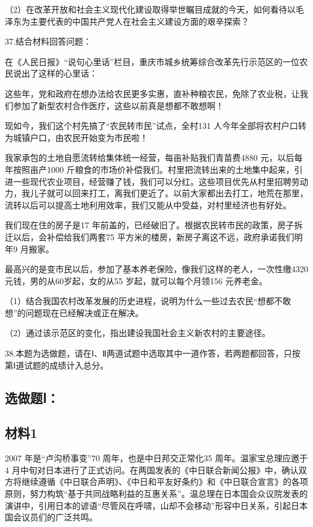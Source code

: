 \documentclass[UTF8,11pt]{ctexart}
\begin{document}
（2）在改革开放和社会主义现代化建设取得举世瞩目成就的今天，如何看待以毛泽东为主要代表的中国共产党人在社会主义建设方面的艰辛探索？


37.结合材料回答问题：

在《人民日报》“说句心里话”栏目，重庆市城乡统筹综合改革先行示范区的一位农民说出了这样的心里话：

这些年，党和政府在想办法给农民更多实惠，直补种粮农民，免除了农业税，让我们参加了新型农村合作医疗，这些以前真是想都不敢想啊！

现如今，我们这个村先搞了“农民转市民”试点，全村131 人今年全部将农村户口转为城镇户口，由农民开始变为市民啦！

我家承包的土地自愿流转给集体统一经营，每亩补贴我们青苗费4880 元，以后每年按照亩产1000 斤粮食的市场价补偿我们。村里把流转出来的土地集中起来，引进一些现代农业项目，经营赚了钱，我们可以分红。这些项目优先从村里招聘劳动力，我儿子就可以回来打工，离我们更近了。以前大家都出去打工，地荒在那里，流转以后可以提高土地利用效率，我们又能从中受益，对村里经济也有好处。

我们现在住的房子是17 年前盖的，已经破旧了。根据农民转市民的政策，房子拆迁以后，会补偿给我们两套75 平方米的楼房，新房子离这不远，政府承诺我们明年9 月搬家。

最高兴的是变市民以后，参加了基本养老保险，像我们这样的老人，一次性缴4320 元钱，男的从60岁起，女的从55 岁起，就可以每个月领156 元养老金。

（1）结合我国农村改革发展的历史进程，说明为什么一些过去农民“想都不敢想”的问题现在已经解决或正在解决。


（2）通过该示范区的变化，指出建设我国社会主义新农村的主要途径。


38.本题为选做题，请在Ⅰ、Ⅱ两道试题中选取其中一道作答，若两题都回答，只按第Ⅰ道试题的成绩计入总分。


\subsection*{选做题Ⅰ：}

\subsection*{材料1}

2007 年是“卢沟桥事变”70 周年，也是中日邦交正常化35 周年。温家宝总理应邀于4 月中旬对日本进行了正式访问。在两国发表的《中日联合新闻公报》中，确认双方将继续遵循《中日联合声明》、《中日和平友好条约》和《中日联合宣言》的各项原则，努力构筑“基于共同战略利益的互惠关系”。温总理在日本国会众议院发表的演讲中，引用日本的谚语“尽管风在呼啸，山却不会移动”形容中日关系，引起日本国会议员们的广泛共鸣。
\end{document}
